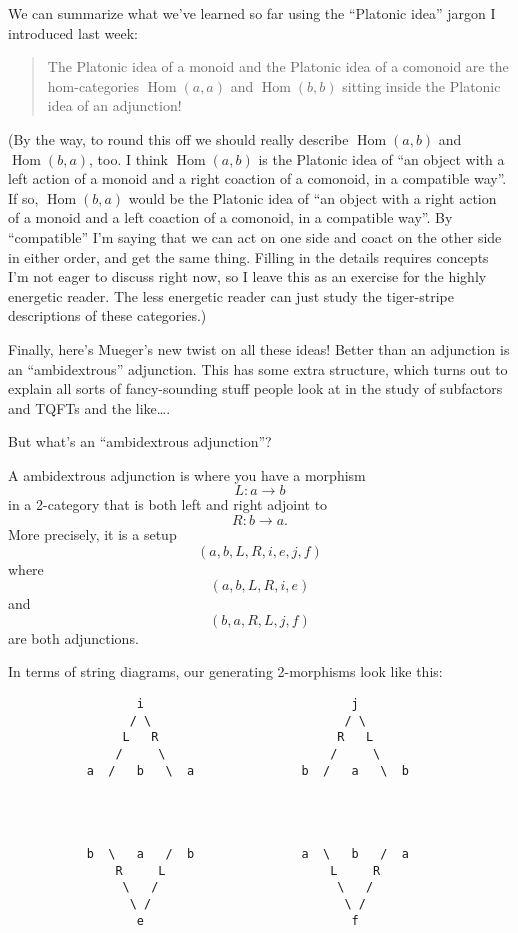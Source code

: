 \documentclass{article}
\begin{document}
We can summarize what we've learned so far using the ``Platonic idea''
jargon I introduced last week:

\begin{quote}
The Platonic idea of a monoid and the Platonic idea of a comonoid are
the hom-categories \(\operatorname{Hom}(a,a)\) and
\(\operatorname{Hom}(b,b)\) sitting inside the Platonic idea of an
adjunction!
\end{quote}

(By the way, to round this off we should really describe
\(\operatorname{Hom}(a,b)\) and \(\operatorname{Hom}(b,a)\), too. I
think \(\operatorname{Hom}(a,b)\) is the Platonic idea of ``an object
with a left action of a monoid and a right coaction of a comonoid, in a
compatible way''. If so, \(\operatorname{Hom}(b,a)\) would be the
Platonic idea of ``an object with a right action of a monoid and a left
coaction of a comonoid, in a compatible way''. By ``compatible'' I'm
saying that we can act on one side and coact on the other side in either
order, and get the same thing. Filling in the details requires concepts
I'm not eager to discuss right now, so I leave this as an exercise for
the highly energetic reader. The less energetic reader can just study
the tiger-stripe descriptions of these categories.)

Finally, here's Mueger's new twist on all these ideas! Better than an
adjunction is an ``ambidextrous'' adjunction. This has some extra
structure, which turns out to explain all sorts of fancy-sounding stuff
people look at in the study of subfactors and TQFTs and the like\ldots.

But what's an ``ambidextrous adjunction''?

A ambidextrous adjunction is where you have a morphism
\[L\colon a \to b\] in a 2-category that is both left and right adjoint
to \[R\colon b \to a.\] More precisely, it is a setup
\[(a,b,L,R,i,e,j,f)\] where \[(a,b,L,R,i,e)\] and \[(b,a,R,L,j,f)\] are
both adjunctions.

In terms of string diagrams, our generating 2-morphisms look like this:

\begin{verbatim}
                  i                             j
                 / \                           / \
                L   R                         R   L
               /     \                       /     \
           a  /   b   \  a               b  /   a   \  b




           b  \   a   /  b               a  \   b   /  a
               R     L                       L     R
                \   /                         \   /
                 \ /                           \ /
                  e                             f
\end{verbatim}
\end{document}
